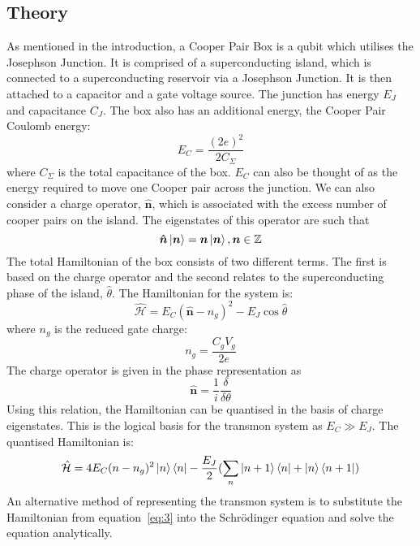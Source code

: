\documentclass[11pt]{article}
\newcommand*{\hatH}{\hat{\mathcal{H}}}
\begin{document}
\subsection{Theory}
As mentioned in the introduction, a Cooper Pair Box is a qubit which utilises the Josephson Junction. It is comprised of a superconducting island, which is connected to a superconducting reservoir via a Josephson Junction. It is then attached to a capacitor and a gate voltage source. The junction has energy $E_J$ and capacitance $C_J$. The box also has an additional energy, the Cooper Pair Coulomb energy:
\begin{equation} \label{eq:1}
E_C =  \frac{(2e)^2}{2C_\Sigma}
\end{equation}
where $C_\Sigma$ is the total capacitance of the box. $E_C$ can also be thought of as the energy required to move one Cooper pair across the junction. We can also consider a charge operator, $\boldsymbol{\hat{n}}$, which is associated with the excess number of cooper pairs on the island. The eigenstates of this operator are such that
\begin{equation} \label{eq:2}
\boldsymbol{\hat{n}}\ket{\boldsymbol{n}} = \boldsymbol{n}\ket{\boldsymbol{n}},  \boldsymbol{n} \in \mathbb{Z}
\end{equation}
The total Hamiltonian of the box consists of two different terms. The first is based on the charge operator and the second relates to the superconducting phase of the island, $\hat{\theta}$. The Hamiltonian for the system is:
\begin{equation} \label{eq:3}
\hatH = E_C (\boldsymbol{\hat{n}} - n_g)^2 - E_J \cos{\hat{\theta}}
\end{equation}
where $n_g$ is the reduced gate charge:
\begin{equation} \label{eq:4}
n_g = \frac{C_g V_g}{2e}
\end{equation}
The charge operator is given in the phase representation as
\begin{equation} \label{eq:5}
\boldsymbol{\hat{n}} = \frac{1}{i} \frac{\delta}{\delta\theta}
\end{equation}
Using this relation, the Hamiltonian can be quantised in the basis of charge eigenstates. This is the logical basis for the transmon system as $E_C \gg E_J$. The quantised Hamiltonian is:
\begin{equation} \label{eq:6}
\hatH = 4E_C (n-n_g)^2 \ket{n}\bra{n} - \frac{E_J}{2}(\sum_{n} \ket{n+1}\bra{n} + \ket{n}\bra{n+1})
\end{equation}
An alternative method of representing the transmon system is to substitute the Hamiltonian from equation~\ref{eq:3} into the Schr\"odinger equation and solve the equation analytically.
\end{document}
